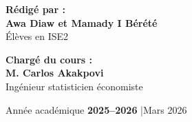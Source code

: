 \begin{titlepage}
  \begin{minipage}[t]{0.45\textwidth}
    \centering
    {\small\bfseries Rédigé par :}\\[0.3cm]
    {\normalsize\bfseries Awa Diaw et Mamady I Bérété}\\[0.15cm]
    {\small Élèves en ISE2}
  \end{minipage}
  \hfill
  \begin{minipage}[t]{0.45\textwidth}
    \centering
    {\small\bfseries Chargé du cours :}\\[0.3cm]
    {\normalsize\bfseries M. Carlos Akakpovi}\\[0.15cm]
    {\small  Ingénieur statisticien économiste}
  \end{minipage}

  \vfill

  {\small Année académique \textbf{2025--2026} \quad|\quad Mars 2026}\\[0.2cm]

  \restoregeometry
\end{titlepage}